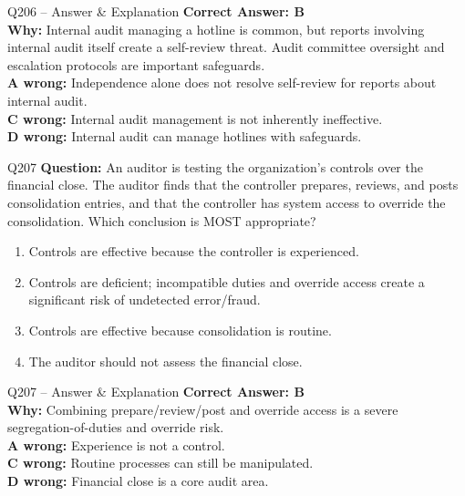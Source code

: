 \documentclass[aspectratio=169,10pt]{beamer}
\begin{document}
	\begin{frame}[t]{Q206 -- Answer \& Explanation}
		\small
		\textbf{Correct Answer: B} \\[4pt]
		\textbf{Why:} Internal audit managing a hotline is common, but reports involving internal audit itself create a self-review threat. Audit committee oversight and escalation protocols are important safeguards. \\[4pt]
		\textbf{A wrong:} Independence alone does not resolve self-review for reports about internal audit. \\[2pt]
		\textbf{C wrong:} Internal audit management is not inherently ineffective. \\[2pt]
		\textbf{D wrong:} Internal audit can manage hotlines with safeguards.
	\end{frame}
	
	\begin{frame}[t]{Q207}
		\small
		\textbf{Question:} An auditor is testing the organization's controls over the financial close. The auditor finds that the controller prepares, reviews, and posts consolidation entries, and that the controller has system access to override the consolidation. Which conclusion is MOST appropriate?
		\begin{enumerate}[label=\Alph*.,itemsep=1pt,topsep=2pt]
			\item Controls are effective because the controller is experienced.
			\item Controls are deficient; incompatible duties and override access create a significant risk of undetected error/fraud.
			\item Controls are effective because consolidation is routine.
			\item The auditor should not assess the financial close.
		\end{enumerate}
	\end{frame}
	
	\begin{frame}[t]{Q207 -- Answer \& Explanation}
		\small
		\textbf{Correct Answer: B} \\[4pt]
		\textbf{Why:} Combining prepare/review/post and override access is a severe segregation-of-duties and override risk. \\[4pt]
		\textbf{A wrong:} Experience is not a control. \\[2pt]
		\textbf{C wrong:} Routine processes can still be manipulated. \\[2pt]
		\textbf{D wrong:} Financial close is a core audit area.
	\end{frame}
	
\end{document}
